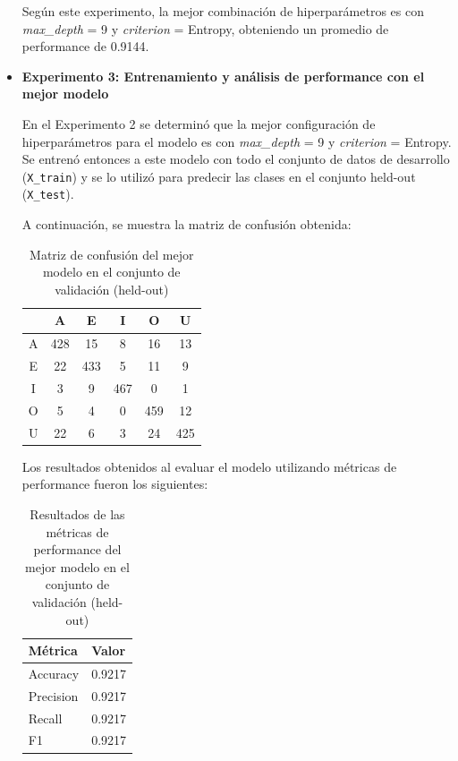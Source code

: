 \documentclass[11pt,a4paper, twocolumn]{article}
\begin{document}
\begin{itemize}
Según este experimento, la mejor combinación de hiperparámetros es con \textit{max\_depth} = 9 y \textit{criterion} = Entropy, obteniendo un promedio de performance de 0.9144.

	\item[]
	\textbf{Experimento 3: Entrenamiento y análisis de performance con el mejor modelo}
	
En el Experimento 2 se determinó que la mejor configuración de hiperparámetros para el modelo es con \textit{max\_depth} = 9 y \textit{criterion} = Entropy. 
Se entrenó entonces a este modelo con todo el conjunto de datos de desarrollo (\texttt{X\_train}) y se lo utilizó para predecir las clases en el conjunto held-out (\texttt{X\_test}). 

A continuación, se muestra la matriz de confusión obtenida:

\begin{table}[H]
    \centering
    \begin{tabular}{c|ccccc}
        & A & E & I & O & U \\
        \hline
        A & 428 & 15 & 8  & 16 & 13 \\
        E & 22  & 433 & 5  & 11 & 9  \\
        I & 3   & 9   & 467 & 0  & 1  \\
        O & 5   & 4   & 0   & 459 & 12 \\
        U & 22  & 6   & 3   & 24 & 425 \\
    \end{tabular}
    \caption{Matriz de confusión del mejor modelo en el conjunto de validación (held-out)}
    \label{tab:matriz_confusion}
\end{table}

Los resultados obtenidos al evaluar el modelo utilizando métricas de performance fueron los siguientes:

\begin{table}[H]
    \centering
    \begin{tabular}{ll}
        \hline
        Métrica    & Valor  \\
        \hline
        Accuracy  & 0.9217 \\
        Precision & 0.9217 \\
        Recall    & 0.9217 \\
        F1        & 0.9217 \\
        \hline
    \end{tabular}
    \caption{Resultados de las métricas de performance del mejor modelo en el conjunto de validación (held-out)}
    \label{tab:resultados}
\end{table}

\end{itemize}
\end{document}
